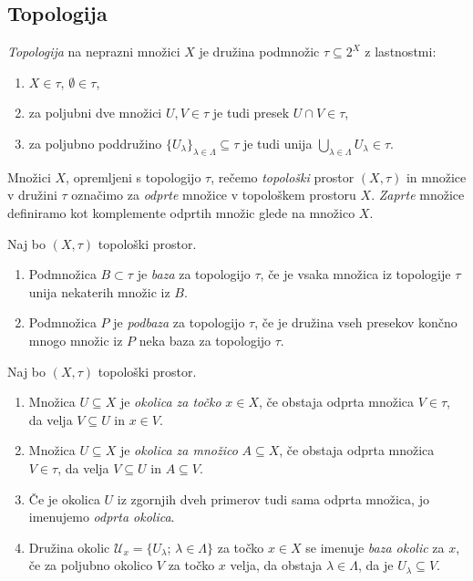 \documentclass[mat1]{fmfdelo}
\newcommand{\Ucurl}{\mathcal{U}}
\begin{document}
\subsection{Topologija}
\begin{definicija}\label{def:topologija}
\emph{Topologija} na neprazni množici $X$ je družina podmnožic $\tau \subseteq 2^X$ z lastnostmi:
\begin{enumerate}
\item $X \in \tau$, $\emptyset \in \tau$,
\item za poljubni dve množici $U,V \in \tau$ je tudi presek $U \cap V \in \tau$,
\item za poljubno poddružino $\lbrace U_{\lambda} \rbrace_{\lambda \in \Lambda} \subseteq \tau$ je tudi unija $\bigcup\limits_{\lambda \in \Lambda}^{} U_{\lambda} \in \tau$.
\end{enumerate}
Množici $X$, opremljeni s topologijo $\tau$, rečemo \emph{topološki} prostor $(X, \tau)$ in množice v družini $\tau$ označimo za \emph{odprte} množice v topološkem prostoru $X$. \emph{Zaprte} množice definiramo kot komplemente odprtih množic glede na množico $X$.
\end{definicija}

\begin{definicija}\label{def:baza}
Naj bo $(X, \tau)$ topološki prostor.
\begin{enumerate}
\item Podmnožica $B \subset \tau$ je \emph{baza} za topologijo $\tau$, če je vsaka množica iz topologije $\tau$ unija nekaterih množic iz $B$.
\item Podmnožica $P$ je \emph{podbaza} za topologijo $\tau$, če je družina vseh presekov končno mnogo množic iz $P$ neka baza za topologijo $\tau$.
\end{enumerate}
\end{definicija}

\begin{definicija}\label{def:okolica}
Naj bo $(X, \tau)$ topološki prostor.
\begin{enumerate}
\item Množica $U \subseteq X$ je \emph{okolica za točko} $x \in X$, če obstaja odprta množica $V \in \tau$, da velja $V \subseteq U$ in $x \in V$.
\item Množica $U \subseteq X$ je \emph{okolica za množico} $A \subseteq X$, če obstaja odprta množica $V \in \tau$, da velja $V \subseteq U$ in $A \subseteq V$.
\item Če je okolica $U$ iz zgornjih dveh primerov tudi sama odprta množica, jo imenujemo \emph{odprta okolica}.
\item Družina okolic $\Ucurl_x = \lbrace U_\lambda$; $\lambda \in \Lambda \rbrace$ za točko $x \in X$ se imenuje \emph{baza okolic} za $x$, če za poljubno okolico $V$ za točko $x$ velja, da obstaja $\lambda \in \Lambda$, da je $U_\lambda \subseteq V$.
\end{enumerate}
\end{definicija}
\end{document}
